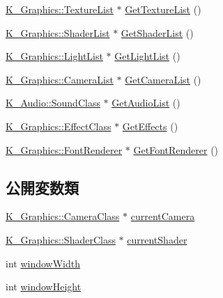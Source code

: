 \begin{DoxyCompactItemize}
\item 
\mbox{\hyperlink{class_k___graphics_1_1_texture_list}{K\+\_\+\+Graphics\+::\+Texture\+List}} $\ast$ \mbox{\hyperlink{class_game_parameters_ac8161d1198add063bd00058e40d17bc3}{Get\+Texture\+List}} ()
\item 
\mbox{\hyperlink{class_k___graphics_1_1_shader_list}{K\+\_\+\+Graphics\+::\+Shader\+List}} $\ast$ \mbox{\hyperlink{class_game_parameters_aa8d4bcae3fd46636db5e3873d43da1e7}{Get\+Shader\+List}} ()
\item 
\mbox{\hyperlink{class_k___graphics_1_1_light_list}{K\+\_\+\+Graphics\+::\+Light\+List}} $\ast$ \mbox{\hyperlink{class_game_parameters_a311ce21eaa2b395f9aefd494499efba2}{Get\+Light\+List}} ()
\item 
\mbox{\hyperlink{class_k___graphics_1_1_camera_list}{K\+\_\+\+Graphics\+::\+Camera\+List}} $\ast$ \mbox{\hyperlink{class_game_parameters_a9f7f396646b1237e067507635b855a61}{Get\+Camera\+List}} ()
\item 
\mbox{\hyperlink{class_k___audio_1_1_sound_class}{K\+\_\+\+Audio\+::\+Sound\+Class}} $\ast$ \mbox{\hyperlink{class_game_parameters_a6f4b624f15e67e3beda12f6b9a999106}{Get\+Audio\+List}} ()
\item 
\mbox{\hyperlink{class_k___graphics_1_1_effect_class}{K\+\_\+\+Graphics\+::\+Effect\+Class}} $\ast$ \mbox{\hyperlink{class_game_parameters_ad367332577a18a1d5968b5f1365d57c5}{Get\+Effects}} ()
\item 
\mbox{\hyperlink{class_k___graphics_1_1_font_renderer}{K\+\_\+\+Graphics\+::\+Font\+Renderer}} $\ast$ \mbox{\hyperlink{class_game_parameters_a37fd8d468387c01d40461ba6a86d156f}{Get\+Font\+Renderer}} ()
\end{DoxyCompactItemize}
\subsection*{公開変数類}
\begin{DoxyCompactItemize}
\item 
\mbox{\hyperlink{class_k___graphics_1_1_camera_class}{K\+\_\+\+Graphics\+::\+Camera\+Class}} $\ast$ \mbox{\hyperlink{class_game_parameters_a8c43ae868a40e67dcec8bab9150c7924}{current\+Camera}}
\item 
\mbox{\hyperlink{class_k___graphics_1_1_shader_class}{K\+\_\+\+Graphics\+::\+Shader\+Class}} $\ast$ \mbox{\hyperlink{class_game_parameters_a411132917bba3c33c5e911fcf6dd9cd1}{current\+Shader}}
\item 
int \mbox{\hyperlink{class_game_parameters_a73787aded537383f803465e8bf6cc9d6}{window\+Width}}
\item 
int \mbox{\hyperlink{class_game_parameters_ad58a3e9137610433664e1b81a8e883b0}{window\+Height}}
\end{DoxyCompactItemize}


